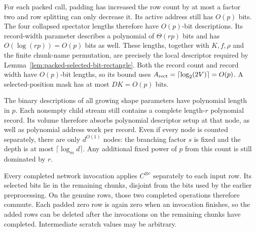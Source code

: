 For each packed call, padding has increased the row count by at most
a factor two and row splitting can only decrease it.  Its active
address still has \(O(p)\) bits. The four collapsed spectator lengths
therefore have \(O(p)\)-bit descriptions. Its record-width parameter
describes a polynomial of \(\Theta(rp)\) bits and has
\(O(\log(rp))=O(p)\) bits as well. These lengths, together with
\(K,f,\rho\) and the finite chunk-name permutation, are precisely the
local descriptor required by
Lemma~\ref{lem:packed-selected-bit-rectangle}. Both the record count
and record width have \(O(p)\)-bit lengths, so its bound uses
\(A_{\rm rect}=\lceil\log_2(2V)\rceil=O(p)\). A selected-position
mask has at most \(DK=O(p)\) bits.

The binary descriptions of all growing shape parameters have
polynomial length in \(p\).  Each nonempty child stream still contains
a complete length-\(r\) polynomial record.  Its volume therefore
absorbs polynomial descriptor setup at that node, as well as
polynomial address work per record.  Even if every node is counted
separately, there are only \(d^{O(1)}\) nodes: the branching factor
\(s\) is fixed and the depth is at most
\(\lceil\log_m d\rceil\).  Any additional fixed power of \(p\)
from this count is still dominated by \(r\).

Every completed network invocation applies \(C^{\otimes e}\)
separately to each input row.  Its selected bits lie in the
remaining chunks, disjoint from the bits used by the earlier
preprocessing.  On the genuine rows, those two completed operations
therefore commute.
Each padded zero row is again zero when an invocation finishes, so the
added rows can be deleted after the invocations on the remaining chunks
have completed. Intermediate scratch values may be arbitrary.

